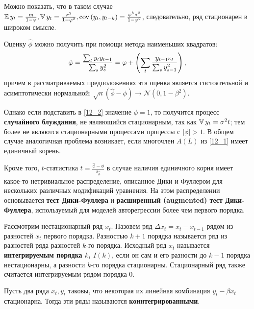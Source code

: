 Можно показать, что в таком случае $\operatorname{\mathbb{E}} y_t = \frac{m}{1-\varphi}, \operatorname{\mathbb{V}} y_t = \frac{\sigma^2}{1-\varphi^2}, \operatorname{cov}\left( y_t, y_{t-k} \right) = \frac{\varphi^k \sigma^2}{1 - \varphi^2}$, следовательно, ряд стационарен в широком смысле.

Оценку $\hat\phi$ можно получить при помощи метода наименьших квадратов:
\begin{equation*}
    \hat{\varphi} = \frac{\sum_{t} y_{t}y_{t-1}}{\sum_s y_s^2} = \varphi + \left( \sum_t \frac{y_{t-1} \varepsilon_t}{\sum_s y_{s-1}^2} \right),
\end{equation*}
причем в рассматриваемых предположениях эта оценка является состоятельной и асимптотически нормальной: $\sqrt{n}\left( \hat\phi - \phi \right) \to \mathcal{N}\left( 0, 1-\beta^2 \right)$.

Однако если подставить в \eqref{12_2} значение $\phi = 1$, то получится процесс \textbf{случайного блуждания}, не являющийся стационарным, так как $\operatorname{\mathbb{V}} y_t = \sigma^2 t$; тем более не являются стационарными процессами процессы с $|\phi| > 1$.
В общем случае аналогичная проблема возникает, если многочлен $A(L)$ из \eqref{12_1} имеет единичный корень.


Кроме того, $t$-статистика $t = \frac{\hat\phi - \phi}{s_{\hat\phi}}$ в случае наличия единичного корня имеет какое-то нетривиальное распределение, описанное Дики и Фуллером для нескольких различных модификаций уравнения.
На этом распределении основывается \textbf{тест Дики-Фуллера} и \textbf{расширенный (augmented) тест Дики-Фуллера}, используемый для моделей авторегрессии более чем первого порядка.


\begin{definition}
    Рассмотрим нестационарный ряд $x_t$.
    Назовем ряд $\Delta x_t = x_t - x_{t-1}$ рядом из разностей $x_t$ первого порядка.
    Разностью $k+1$ порядка называется ряд из разностей ряда разностей $k$-го порядка.
    Исходный ряд $x_t$ называется \textbf{интегрируемым порядка $k$, $I(k)$}, если он сам и его разности до $k-1$ порядка нестационарны, а разности $k$-го порядка стационарны.
    Стационарный ряд также считается интегрируемым рядом порядка $0$.
\end{definition}

\begin{definition}[Коинтеграция]
    Пусть два ряда $x_t, y_t$ таковы, что некоторая их линейная комбинация $y_t - \beta x_t$ стационарна.
    Тогда эти ряды называются \textbf{коинтегрированными}.
\end{definition}

